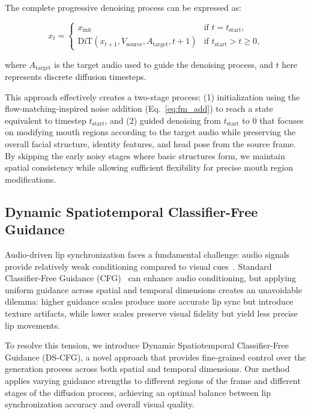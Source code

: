 The complete progressive denoising process can be expressed as:

\vspace{-0.5em}
\begin{equation}
x_{t} = \begin{cases}
x_{\text{init}} & \text{if } t = t_{\text{start}}, \\
\text{DiT}(x_{t+1}, V_{\text{source}}, A_{\text{target}}, t+1) & \text{if } t_{\text{start}} > t \geq 0,
\end{cases}
\label{eq:progressive_denoising}
\end{equation}
\vspace{-0.5em}


where $A_{\text{target}}$ is the target audio used to guide the denoising process, and $t$ here represents discrete diffusion timesteps.

This approach effectively creates a two-stage process: (1) initialization using the flow-matching-inspired noise addition (Eq.~\ref{eq:fm_add}) to reach a state equivalent to timestep $t_{\text{start}}$, and (2) guided denoising from $t_{\text{start}}$ to 0 that focuses on modifying mouth regions according to the target audio while preserving the overall facial structure, identity features, and head pose from the source frame. By skipping the early noisy stages where basic structures form, we maintain spatial consistency while allowing sufficient flexibility for precise mouth region modifications.

\vspace{-0.3em}
\subsection{Dynamic Spatiotemporal Classifier-Free Guidance}
\vspace{-0.3em}

Audio-driven lip synchronization faces a fundamental challenge: audio signals provide relatively weak conditioning compared to visual cues~\cite{wang2024v}. Standard Classifier-Free Guidance (CFG)~\cite{ho2022classifier} can enhance audio conditioning, but applying uniform guidance across spatial and temporal dimensions creates an unavoidable dilemma: higher guidance scales produce more accurate lip sync but introduce texture artifacts, while lower scales preserve visual fidelity but yield less precise lip movements.

To resolve this tension, we introduce Dynamic Spatiotemporal Classifier-Free Guidance (DS-CFG), a novel approach that provides fine-grained control over the generation process across both spatial and temporal dimensions. Our method applies varying guidance strengths to different regions of the frame and different stages of the diffusion process, achieving an optimal balance between lip synchronization accuracy and overall visual quality.

